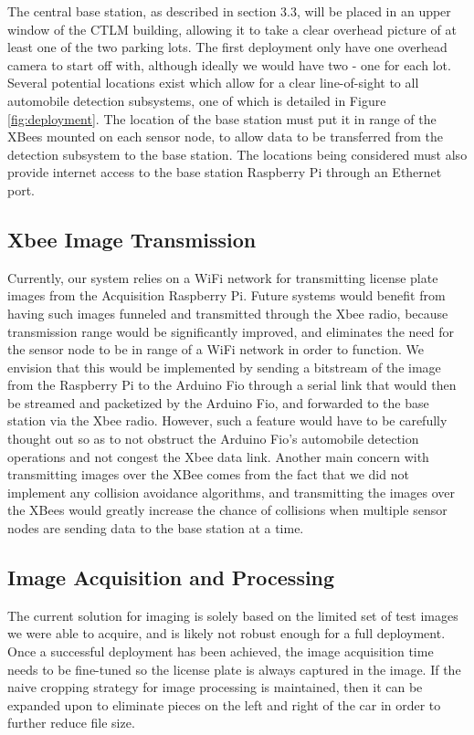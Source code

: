 \documentclass[11pt, oneside, fullpage, doublespace]{article}
\begin{document}
The central base station, as described in section 3.3, will be placed in an upper window of the CTLM building, allowing it to take a clear overhead picture of at least one of the two parking lots. The first deployment only have one overhead camera to start off with, although ideally we would have two - one for each lot. Several potential locations exist which allow for a clear line-of-sight to all automobile detection subsystems, one of which is detailed in Figure \ref{fig:deployment}. The location of the base station must put it in range of the XBees mounted on each sensor node, to allow data to be transferred from the detection subsystem to the base station. The locations being considered must also provide internet access to the base station Raspberry Pi through an Ethernet port.

\subsection{Xbee Image Transmission}
Currently, our system relies on a WiFi network for transmitting license plate images from the Acquisition Raspberry Pi. Future systems would benefit from having such images funneled and transmitted through the Xbee radio, because transmission range would be significantly improved, and eliminates the need for the sensor node to be in range of a WiFi network in order to function. We envision that this would be implemented by sending a bitstream of the image from the Raspberry Pi to the Arduino Fio through a serial link that would then be streamed and packetized by the Arduino Fio, and forwarded to the base station via the Xbee radio. However, such a feature would have to be carefully thought out so as to not obstruct the Arduino Fio's automobile detection operations and not congest the Xbee data link. Another main concern with transmitting images over the XBee comes from the fact that we did not implement any collision avoidance algorithms, and transmitting the images over the XBees would greatly increase the chance of collisions when multiple sensor nodes are sending data to the base station at a time.

\subsection{Image Acquisition and Processing}
The current solution for imaging is solely based on the limited set of test images we were able to acquire, and is likely not robust enough for a full deployment. Once a successful deployment has been achieved, the image acquisition time needs to be fine-tuned so the license plate is always captured in the image. If the naive cropping strategy for image processing is maintained, then it can be expanded upon to eliminate pieces on the left and right of the car in order to further reduce file size.
\end{document}

